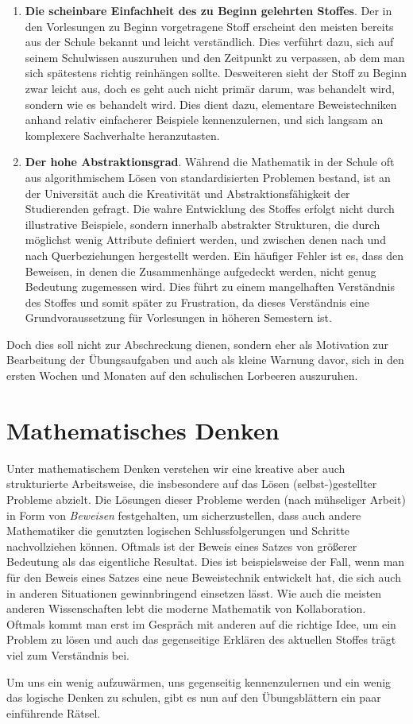 \begin{enumerate}
\item \textbf{Die scheinbare Einfachheit des zu Beginn gelehrten Stoffes}.
Der in den Vorlesungen zu Beginn vorgetragene Stoff erscheint den meisten
bereits aus der Schule bekannt und leicht verständlich.
Dies verführt dazu, sich auf seinem Schulwissen auszuruhen und den Zeitpunkt
zu verpassen, ab dem man sich spätestens richtig reinhängen sollte.
Desweiteren sieht der Stoff zu Beginn zwar leicht aus, doch es geht auch nicht
primär darum, was behandelt wird, sondern wie es behandelt wird.
Dies dient dazu, elementare Beweistechniken anhand relativ einfacherer
Beispiele kennenzulernen, und sich langsam an komplexere Sachverhalte
heranzutasten.

\item \textbf{Der hohe Abstraktionsgrad}.
Während die Mathematik in der Schule oft aus algorithmischem Lösen von
standardisierten Problemen bestand, ist an der Universität auch die Kreativität
und Abstraktionsfähigkeit der Studierenden gefragt.
Die wahre Entwicklung des Stoffes erfolgt nicht durch illustrative Beispiele,
sondern innerhalb abstrakter Strukturen, die durch möglichst wenig Attribute
definiert werden, und zwischen denen nach und nach Querbeziehungen hergestellt
werden.
Ein häufiger Fehler ist es, dass den Beweisen, in denen die Zusammenhänge
aufgedeckt werden, nicht genug Bedeutung zugemessen wird.
Dies führt zu einem mangelhaften Verständnis des Stoffes und somit später zu
Frustration, da dieses Verständnis eine Grundvoraussetzung für Vorlesungen in
höheren Semestern ist.
\end{enumerate}

Doch dies soll nicht zur Abschreckung dienen, sondern eher als Motivation zur
Bearbeitung der Übungsaufgaben und auch als kleine Warnung davor, sich in den
ersten Wochen und Monaten auf den schulischen Lorbeeren auszuruhen.


\section{Mathematisches Denken}
Unter mathematischem Denken verstehen wir eine kreative aber auch strukturierte
Arbeitsweise, die insbesondere auf das Lösen (selbst-)gestellter Probleme
abzielt.
Die Lösungen dieser Probleme werden (nach mühseliger Arbeit) in Form von
\textit{Beweisen} festgehalten, um sicherzustellen, dass auch andere
Mathematiker die genutzten logischen Schlussfolgerungen und Schritte
nachvollziehen können.
Oftmals ist der Beweis eines Satzes von größerer Bedeutung als das eigentliche
Resultat.
Dies ist beispielsweise der Fall, wenn man für den Beweis eines Satzes eine
neue Beweistechnik entwickelt hat, die sich auch in anderen Situationen
gewinnbringend einsetzen lässt.
Wie auch die meisten anderen Wissenschaften lebt die moderne Mathematik von
Kollaboration.
Oftmals kommt man erst im Gespräch mit anderen auf die richtige Idee, um ein
Problem zu lösen und auch das gegenseitige Erklären des aktuellen Stoffes trägt
viel zum Verständnis bei.

Um uns ein wenig aufzuwärmen, uns gegenseitig kennenzulernen und ein wenig das
logische Denken zu schulen, gibt es nun auf den Übungsblättern ein paar
einführende Rätsel.
